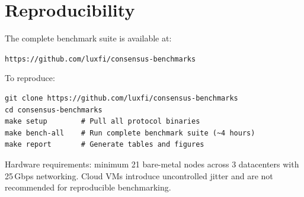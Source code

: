 \section{Reproducibility}

\label{app:reproduce}

The complete benchmark suite is available at:
\begin{center}
\texttt{https://github.com/luxfi/consensus-benchmarks}
\end{center}

\noindent To reproduce:
\begin{verbatim}
git clone https://github.com/luxfi/consensus-benchmarks
cd consensus-benchmarks
make setup        # Pull all protocol binaries
make bench-all    # Run complete benchmark suite (~4 hours)
make report       # Generate tables and figures
\end{verbatim}

\noindent Hardware requirements: minimum 21 bare-metal nodes across 3 datacenters with
25\,Gbps networking. Cloud VMs introduce uncontrolled jitter and are not recommended for
reproducible benchmarking.

